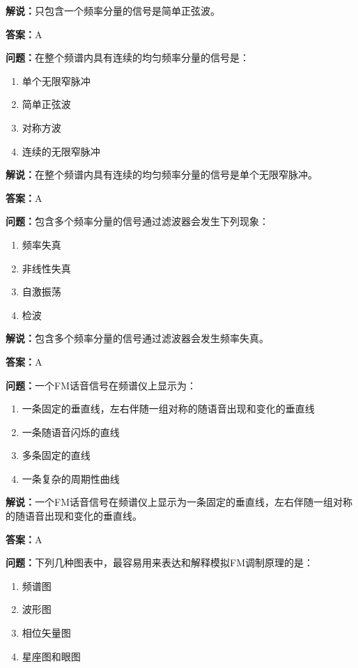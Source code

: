 \documentclass[UTF8]{ctexbook}
\begin{document}
\textbf{解说：}只包含一个频率分量的信号是简单正弦波。%

\textbf{答案：}A

\textbf{问题：}在整个频谱内具有连续的均匀频率分量的信号是：

\begin{enumerate}[label=\Alph*), leftmargin=3em]
  \item 单个无限窄脉冲
  \item 简单正弦波
  \item 对称方波
  \item 连续的无限窄脉冲
\end{enumerate}

\textbf{解说：}在整个频谱内具有连续的均匀频率分量的信号是单个无限窄脉冲。%

\textbf{答案：}A

\textbf{问题：}包含多个频率分量的信号通过滤波器会发生下列现象：

\begin{enumerate}[label=\Alph*), leftmargin=3em]
  \item 频率失真
  \item 非线性失真
  \item 自激振荡
  \item 检波
\end{enumerate}

\textbf{解说：}包含多个频率分量的信号通过滤波器会发生频率失真。%

\textbf{答案：}A

\textbf{问题：}一个FM话音信号在频谱仪上显示为：

\begin{enumerate}[label=\Alph*), leftmargin=3em]
  \item 一条固定的垂直线，左右伴随一组对称的随语音出现和变化的垂直线
  \item 一条随语音闪烁的直线
  \item 多条固定的直线
  \item 一条复杂的周期性曲线
\end{enumerate}

\textbf{解说：}一个FM话音信号在频谱仪上显示为一条固定的垂直线，左右伴随一组对称的随语音出现和变化的垂直线。%

\textbf{答案：}A

\textbf{问题：}下列几种图表中，最容易用来表达和解释模拟FM调制原理的是：

\begin{enumerate}[label=\Alph*), leftmargin=3em]
  \item 频谱图
  \item 波形图
  \item 相位矢量图
  \item 星座图和眼图
\end{enumerate}
\end{document}

